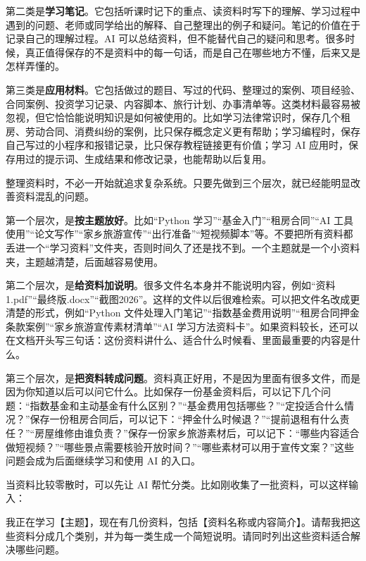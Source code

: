 第二类是\textbf{学习笔记}。它包括听课时记下的重点、读资料时写下的理解、学习过程中遇到的问题、老师或同学给出的解释、自己整理出的例子和疑问。笔记的价值在于记录自己的理解过程。AI 可以总结资料，但不能替代自己的疑问和思考。很多时候，真正值得保存的不是资料中的每一句话，而是自己在哪些地方不懂，后来又是怎样弄懂的。

第三类是\textbf{应用材料}。它包括做过的题目、写过的代码、整理过的案例、项目经验、合同案例、投资学习记录、内容脚本、旅行计划、办事清单等。这类材料最容易被忽视，但它恰恰能说明知识是如何被使用的。比如学习法律常识时，保存几个租房、劳动合同、消费纠纷的案例，比只保存概念定义更有帮助；学习编程时，保存自己写过的小程序和报错记录，比只保存教程链接更有价值；学习 AI 应用时，保存用过的提示词、生成结果和修改记录，也能帮助以后复用。


整理资料时，不必一开始就追求复杂系统。只要先做到三个层次，就已经能明显改善资料混乱的问题。

第一个层次，是\textbf{按主题放好}。比如“Python 学习”“基金入门”“租房合同”“AI 工具使用”“论文写作”“家乡旅游宣传”“出行准备”“短视频脚本”等。不要把所有资料都丢进一个“学习资料”文件夹，否则时间久了还是找不到。一个主题就是一个小资料夹，主题越清楚，后面越容易使用。

第二个层次，是\textbf{给资料加说明}。很多文件名本身并不能说明内容，例如“资料1.pdf”“最终版.docx”“截图2026”。这样的文件以后很难检索。可以把文件名改成更清楚的形式，例如“Python 文件处理入门笔记”“指数基金费用说明”“租房合同押金条款案例”“家乡旅游宣传素材清单”“AI 学习方法资料卡”。如果资料较长，还可以在文档开头写三句话：这份资料讲什么、适合什么时候看、里面最重要的内容是什么。

第三个层次，是\textbf{把资料转成问题}。资料真正好用，不是因为里面有很多文件，而是因为你知道以后可以问它什么。比如保存一份基金资料后，可以记下几个问题：“指数基金和主动基金有什么区别？”“基金费用包括哪些？”“定投适合什么情况？”保存一份租房合同后，可以记下：“押金什么时候退？”“提前退租有什么责任？”“房屋维修由谁负责？”保存一份家乡旅游素材后，可以记下：“哪些内容适合做短视频？”“哪些景点需要核验开放时间？”“哪些素材可以用于宣传文案？”这些问题会成为后面继续学习和使用 AI 的入口。


当资料比较零散时，可以先让 AI 帮忙分类。比如刚收集了一批资料，可以这样输入：

\begin{tcolorbox}[promptbox]
我正在学习【主题】，现在有几份资料，包括【资料名称或内容简介】。请帮我把这些资料分成几个类别，并为每一类生成一个简短说明。请同时列出这些资料适合解决哪些问题。
\end{tcolorbox}

